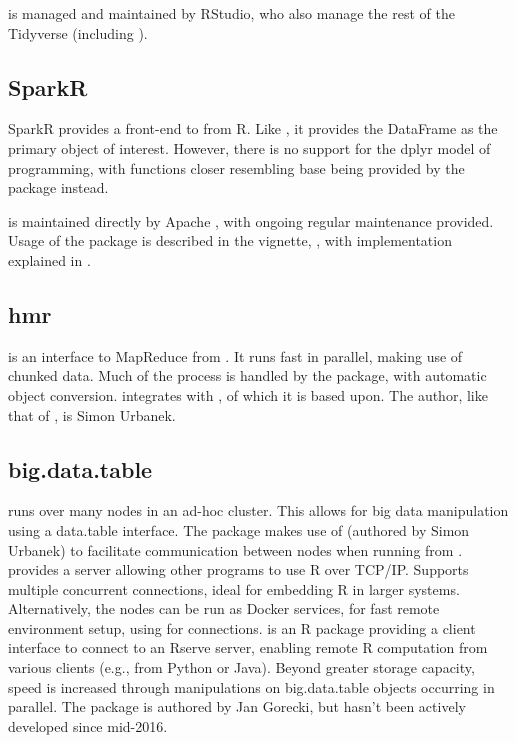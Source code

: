  is managed and maintained by RStudio, who also manage the rest
of the Tidyverse (including ).

\subsection{SparkR}\label{subsec:sparkr}

SparkR provides a front-end to  from R\cite{venkataraman20:_spark}.
Like , it provides the DataFrame as the primary object of interest.
However, there is no support for the dplyr model of programming, with functions closer resembling base \R{} being provided by the package instead.

 is maintained directly by Apache , with ongoing regular
maintenance provided.
Usage of the package is described in the vignette, \textcite{venktaraman19:spark-pract-guide}, with implementation explained in \cite{venkataraman2016sparkr}.

\subsection{hmr}\label{subsec:hmr}

 is an interface to MapReduce from \R{}\cite{urbanek20}.
It runs fast in parallel, making use of chunked data.
Much of the process is handled by the package, with automatic \R{} object conversion.
 integrates with
, of which it is based upon.
The author, like that of , is Simon Urbanek.

\subsection{big.data.table}\label{subsec:big.data.table}

 runs  over many nodes in an ad-hoc
cluster\cite{gorecki16}.
This allows for big data manipulation using a data.table interface.
The package makes use of  (authored by Simon Urbanek) to facilitate communication between nodes when running from \R{}.
 provides a server allowing other programs to use R over TCP/IP. Supports multiple concurrent connections, ideal for embedding R in larger systems.
Alternatively, the nodes can be run as Docker services, for fast remote environment setup, using  for connections.
 is an R package providing a client interface to connect to an Rserve server, enabling remote R computation from various clients (e.g., from Python or Java).
Beyond greater storage capacity, speed is increased through manipulations on big.data.table objects occurring in parallel.
The package is authored by Jan Gorecki, but hasn't been actively developed since mid-2016.
